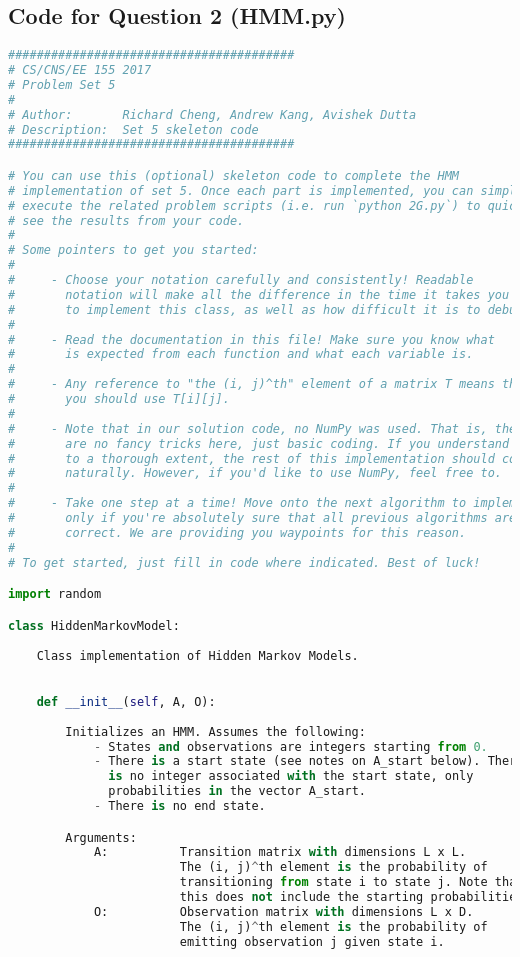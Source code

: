 \subsection*{Code for Question 2 (HMM.py)}
\small
\begin{lstlisting}[language=Python]
########################################
# CS/CNS/EE 155 2017
# Problem Set 5
#
# Author:       Richard Cheng, Andrew Kang, Avishek Dutta
# Description:  Set 5 skeleton code
########################################

# You can use this (optional) skeleton code to complete the HMM
# implementation of set 5. Once each part is implemented, you can simply
# execute the related problem scripts (i.e. run `python 2G.py`) to quickly
# see the results from your code.
#
# Some pointers to get you started:
#
#     - Choose your notation carefully and consistently! Readable
#       notation will make all the difference in the time it takes you
#       to implement this class, as well as how difficult it is to debug.
#
#     - Read the documentation in this file! Make sure you know what
#       is expected from each function and what each variable is.
#
#     - Any reference to "the (i, j)^th" element of a matrix T means that
#       you should use T[i][j].
#
#     - Note that in our solution code, no NumPy was used. That is, there
#       are no fancy tricks here, just basic coding. If you understand HMMs
#       to a thorough extent, the rest of this implementation should come
#       naturally. However, if you'd like to use NumPy, feel free to.
#
#     - Take one step at a time! Move onto the next algorithm to implement
#       only if you're absolutely sure that all previous algorithms are
#       correct. We are providing you waypoints for this reason.
#
# To get started, just fill in code where indicated. Best of luck!

import random

class HiddenMarkovModel:
    
    Class implementation of Hidden Markov Models.
    

    def __init__(self, A, O):
        
        Initializes an HMM. Assumes the following:
            - States and observations are integers starting from 0. 
            - There is a start state (see notes on A_start below). There
              is no integer associated with the start state, only
              probabilities in the vector A_start.
            - There is no end state.

        Arguments:
            A:          Transition matrix with dimensions L x L.
                        The (i, j)^th element is the probability of
                        transitioning from state i to state j. Note that
                        this does not include the starting probabilities.
            O:          Observation matrix with dimensions L x D.
                        The (i, j)^th element is the probability of
                        emitting observation j given state i.


\end{lstlisting}
